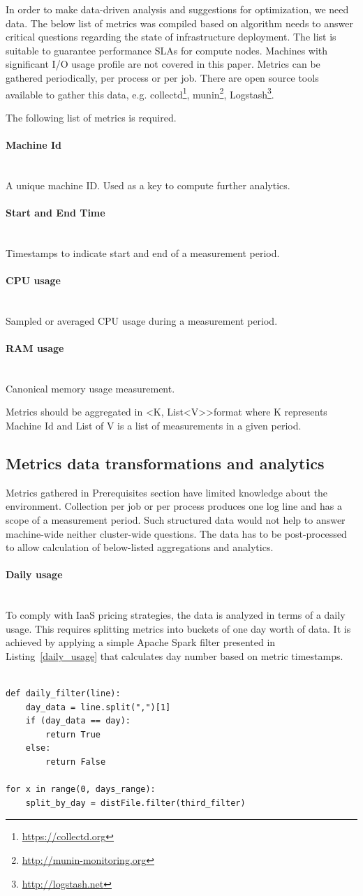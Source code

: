 \documentclass[]{final_report}
\newcommand{\myparagraph}[1]{\paragraph{#1}\mbox{}\\}
\begin{document}
In order to make data-driven analysis and suggestions for optimization, we need data. The below list of metrics was compiled based on algorithm needs to answer critical questions regarding the state of infrastructure deployment. The list is suitable to guarantee performance SLAs for compute nodes. Machines with significant I/O usage profile are not covered in this paper. 
Metrics can be gathered periodically, per process or per job. There are open source tools available to gather this data, e.g. collectd\footnote{\url{https://collectd.org}}, munin\footnote{\url{http://munin-monitoring.org}}, Logstash\footnote{\url{http://logstash.net}}.

The following list of metrics is required.
\myparagraph{Machine Id}
A unique machine ID. Used as a key to compute further analytics.

\myparagraph{Start and End Time}
Timestamps to indicate start and end of a measurement period.

\myparagraph{CPU usage}
Sampled or averaged CPU usage during a measurement period. 

\myparagraph{RAM usage}
Canonical memory usage measurement. 

Metrics should be aggregated in \textless K, List\textless V\textgreater\textgreater format where K represents Machine Id and List of V is a list of measurements in a given period. 

\subsection{Metrics data transformations and analytics}

Metrics gathered in Prerequisites section have limited knowledge about the environment. Collection per job or per process produces one log line and has a scope of a measurement period. Such structured data would not help to answer machine-wide neither cluster-wide questions. The data has to be post-processed to allow calculation of below-listed aggregations and analytics.   

\myparagraph{Daily usage}

To comply with IaaS pricing strategies, the data is analyzed in terms of a daily usage. This requires splitting metrics into buckets of one day worth of data. 
It is achieved by applying a simple Apache Spark filter presented in Listing~\ref{daily_usage} that calculates day number based on metric timestamps.

\begin{lstlisting}[label={daily_usage},caption={Daily usage filter},frame=single]

def daily_filter(line):
    day_data = line.split(",")[1]
    if (day_data == day):
        return True
    else:
        return False

for x in range(0, days_range):
    split_by_day = distFile.filter(third_filter)

\end{lstlisting} 
\end{document}
